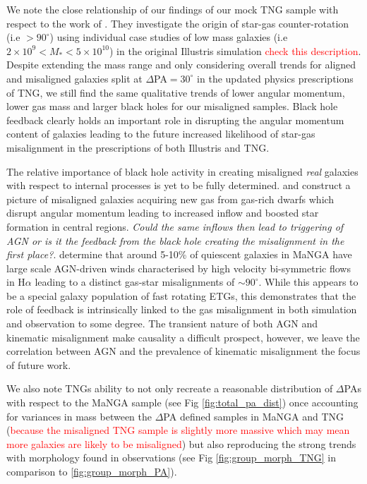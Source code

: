 \documentclass[fleqn,usenatbib]{mnras}
\newcommand{\red}[1]{{\textcolor{red}{#1}}}
\begin{document}
We note the close relationship of our findings of our mock TNG sample with respect to the work of \citet{starkenburg+19}. They investigate the origin of star-gas counter-rotation (i.e $ > 90^{\circ}$) using individual case studies of low mass galaxies (i.e $2 \times 10^{9} < M_{\ast} < 5 \times 10^{10}$) in the original Illustris simulation \red{check this description}. Despite extending the mass range and only considering overall trends for aligned and misaligned galaxies split at $\Delta$PA$= 30^{\circ}$ in the updated physics prescriptions of TNG, we still find the same qualitative trends of lower angular momentum, lower gas mass and larger black holes for our misaligned samples. Black hole feedback clearly holds an important role in disrupting the angular momentum content of galaxies leading to the future increased likelihood of star-gas misalignment in the prescriptions of both Illustris and TNG. 

The relative importance of black hole activity in creating misaligned \textit{real} galaxies with respect to internal processes is yet to be fully determined. \citet{chen2016} and \citet{jin2016} construct a picture of misaligned galaxies acquiring new gas from gas-rich dwarfs which disrupt angular momentum leading to increased inflow and boosted star formation in central regions. \textit{Could the same inflows then lead to triggering of AGN or is it the feedback from the black hole creating the misalignment in the first place?}. \citet{roy2018} determine that around 5-10\% of quiescent galaxies in MaNGA have large scale AGN-driven winds characterised by high velocity bi-symmetric flows in H$\alpha$ leading to a distinct gas-star misalignments of $\sim 90^{\circ}$. While this appears to be a special galaxy population of fast rotating ETGs, this demonstrates that the role of feedback is intrinsically linked to the gas misalignment in both simulation and observation to some degree. The transient nature of both AGN and kinematic misalignment make causality a difficult prospect, however, we leave the correlation between AGN and the prevalence of kinematic misalignment the focus of future work. 

We also note TNGs ability to not only recreate a reasonable distribution of $\Delta$PAs with respect to the MaNGA sample (see Fig \ref{fig:total_pa_dist}) once accounting for variances in mass between the $\Delta$PA defined samples in MaNGA and TNG (\red{because the misaligned TNG sample is slightly more massive which may mean more galaxies are likely to be misaligned}) but also reproducing the strong trends with morphology found in observations (see Fig \ref{fig:group_morph_TNG} in comparison to \ref{fig:group_morph_PA}). 
\end{document}
